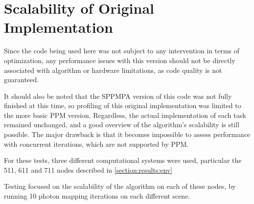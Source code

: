 \documentclass[main.tex]{subfiles}
\begin{document}
\section{Scalability of Original Implementation} \label{sec:results:original}

Since the code being used here was not subject to any intervention in terms of optimization, any performance issues with this version should not be directly associated with algorithm or hardware limitations, as code quality is not guaranteed.

It should also be noted that the SPPMPA version of this code was not fully finished at this time, so profiling of this original implementation was limited to the more basic PPM version. Regardless, the actual implementation of each task remained unchanged, and a good overview of the algorithm's scalability is still possible. The major drawback is that it becomes impossible to assess performance with concurrent iterations, which are not supported by PPM.

For these tests, three different computational systems were used, particular the 511, 611 and 711 nodes described in \cref{section:results:env}

Testing focused on the scalability of the algorithm on each of these nodes, by running 10 photon mapping iterations on each different scene.
\end{document}

